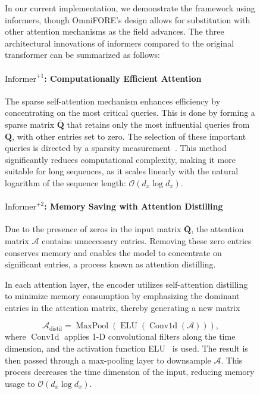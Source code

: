 \begin{figure}[!htbp]
{In our current implementation, we demonstrate the framework using informers, though \ac{OmniFORE}'s design allows for substitution with other attention mechanisms as the field advances. The three architectural innovations of informers compared to the original transformer can be summarized as follows:

\paragraph*{$\text{Informer}^{+1}$: Computationally Efficient Attention}

The sparse self-attention mechanism enhances efficiency by concentrating on the most critical queries. This is done by forming a sparse matrix $\overline{\mathbf{Q}}$ that retains only the most influential queries from $\mathbf{Q}$, with other entries set to zero. The selection of these important queries is directed by a sparsity measurement~\cite{zhou2021informer}. This method significantly reduces computational complexity, making it more suitable for long sequences, as it scales linearly with the natural logarithm of the sequence length: $\mathcal{O}(d_x \log d_x)$.

\paragraph*{$\text{Informer}^{+2}$: Memory Saving with Attention Distilling}

Due to the presence of zeros in the input matrix $\overline{\mathbf{Q}}$, the attention matrix $\mathcal{A}$ contains unnecessary entries. Removing these zero entries conserves memory and enables the model to concentrate on significant entries, a process known as attention distilling.

In each attention layer, the encoder utilizes self-attention distilling to minimize memory consumption by emphasizing the dominant entries in the attention matrix, thereby generating a new matrix

\begin{equation}
\mathcal{A}_{\text{distil}} = \operatorname{MaxPool}\left(\operatorname{ELU}\left(\operatorname{Conv1d}\left(\mathcal{A}\right)\right)\right),
\end{equation}
where $\operatorname{Conv1d}$ applies 1-D convolutional filters along the time dimension, and the activation function \ac{ELU}~\cite{clevert2016fast} is used. The result is then passed through a max-pooling layer to downsample $\mathcal{A}$. This process decreases the time dimension of the input, reducing memory usage to $\mathcal{O}(d_x \log d_x)$.

}
\end{figure}

